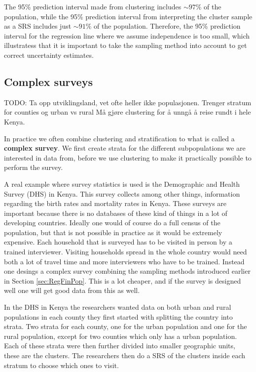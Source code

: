 \documentclass{article}
\begin{document}
\begin{example}
  The 95\% prediction interval made from clustering includes \(\sim 97\%\) of the
  population, while the 95\% prediction interval from interpreting the cluster
  sample as a SRS includes just \(\sim 91\%\) of the population. Therefore, the 95\%
  prediction interval for the regression line where we assume independence is
  too small, which illustratess that it
  is important to take the sampling method into account to get correct
  uncertainty estimates.

  
\end{example}

\subsection{Complex surveys}

TODO: Ta opp utviklingsland, vet ofte heller ikke populasjonen.
Trenger stratum for counties og urban vs rural
Må gjøre clustering for å unngå å reise rundt i hele Kenya.

In practice we often combine clustering and stratification to what is called a
\textbf{complex survey}. We first create strata for the different subpopulations
we are interested in data from, before we use clustering to make it
practically possible to perform the survey.

A real example where survey statistics is used is the Demographic and Health
Survey (DHS) in Kenya. This survey collects among other things, 
information regarding the birth rates and mortality rates in Kenya. These
surveys are important because there is no databases of these kind of things in a
lot of developing countries.
Ideally one would of course do a full census of the population, but that is not
possible in practice as it would be extremely expensive. Each household that is
surveyed has to be visited in person by a trained interviewer. Visiting
households spread in the whole country would need both a lot of travel time and
more interviewers who have to be trained. Instead one desings a
complex survey combining the sampling methods introduced earlier in Section
\ref{sec:RegFinPop}. This is a lot cheaper, and if the survey is designed well
one will get good data from this as well.

In the DHS in Kenya the researchers wanted data on both urban and rural
populations in each county they first started with splitting the country into
strata. Two strata for each county, one for the urban population and one for the
rural population, except for two counties which only has a urban population.
Each of these strata were then further divided into smaller geographic units,
these are the clusters. The researchers then do a SRS of the clusters inside
each stratum to choose which ones to visit.
\end{document}
